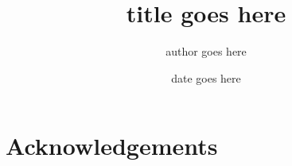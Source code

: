 \documentclass[12pt,a4paper]{report}
\begin{document}
\title{title goes here}
\author{author goes here}
\date{date goes here}
\maketitle


\tableofcontents
\listoffigures
\listoftables

\chapter*{Acknowledgements}










\end{document}
